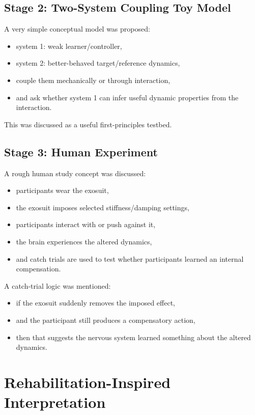 \documentclass[11pt]{article}
\begin{document}
\subsection{Stage 2: Two-System Coupling Toy Model}
A very simple conceptual model was proposed:
\begin{itemize}[leftmargin=1.5em]
    \item system 1: weak learner/controller,
    \item system 2: better-behaved target/reference dynamics,
    \item couple them mechanically or through interaction,
    \item and ask whether system 1 can infer useful dynamic properties from the interaction.
\end{itemize}

This was discussed as a useful first-principles testbed.

\subsection{Stage 3: Human Experiment}
A rough human study concept was discussed:
\begin{itemize}[leftmargin=1.5em]
    \item participants wear the exosuit,
    \item the exosuit imposes selected stiffness/damping settings,
    \item participants interact with or push against it,
    \item the brain experiences the altered dynamics,
    \item and catch trials are used to test whether participants learned an internal compensation.
\end{itemize}

A catch-trial logic was mentioned:
\begin{itemize}[leftmargin=1.5em]
    \item if the exosuit suddenly removes the imposed effect,
    \item and the participant still produces a compensatory action,
    \item then that suggests the nervous system learned something about the altered dynamics.
\end{itemize}

\pagebreak 
\section{Rehabilitation-Inspired Interpretation}
\end{document}
